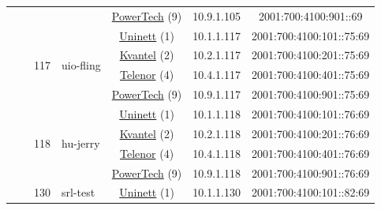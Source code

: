 \begin{small}
\begin{center}
\begin{longtable}{|c|c|c|c|c|c|c|c|}
  &  & \multicolumn{2}{|c|}{} & \multicolumn{2}{|c|}{\tiny{\href{http://www.powertech.no}{PowerTech} (9)}} & \tiny{10.9.1.105} & \tiny{2001:700:4100:901::69} \\* \cline{3-3}\cline{4-4}\cline{5-5}\cline{6-6}\cline{7-7}\cline{8-8}
  &  & \multirow{4}{*}{\tiny{117}} & \multicolumn{1}{|l|}{\multirow{4}{*}{\tiny{uio-fling}}} & \multicolumn{2}{|c|}{\tiny{\href{https://www.uninett.no}{Uninett} (1)}} & \tiny{10.1.1.117} & \tiny{2001:700:4100:101::75:69} \\* \cline{5-5}\cline{6-6}\cline{7-7}\cline{8-8}
  &  &  &  & \multicolumn{2}{|c|}{\tiny{\href{http://kvantel.no}{Kvantel} (2)}} & \tiny{10.2.1.117} & \tiny{2001:700:4100:201::75:69} \\* \cline{5-5}\cline{6-6}\cline{7-7}\cline{8-8}
  &  &  &  & \multicolumn{2}{|c|}{\tiny{\href{https://www.telenor.no}{Telenor} (4)}} & \tiny{10.4.1.117} & \tiny{2001:700:4100:401::75:69} \\* \cline{5-5}\cline{6-6}\cline{7-7}\cline{8-8}
  &  &  &  & \multicolumn{2}{|c|}{\tiny{\href{http://www.powertech.no}{PowerTech} (9)}} & \tiny{10.9.1.117} & \tiny{2001:700:4100:901::75:69} \\* \cline{3-3}\cline{4-4}\cline{5-5}\cline{6-6}\cline{7-7}\cline{8-8}
  &  & \multirow{4}{*}{\tiny{118}} & \multicolumn{1}{|l|}{\multirow{4}{*}{\tiny{hu-jerry}}} & \multicolumn{2}{|c|}{\tiny{\href{https://www.uninett.no}{Uninett} (1)}} & \tiny{10.1.1.118} & \tiny{2001:700:4100:101::76:69} \\* \cline{5-5}\cline{6-6}\cline{7-7}\cline{8-8}
  &  &  &  & \multicolumn{2}{|c|}{\tiny{\href{http://kvantel.no}{Kvantel} (2)}} & \tiny{10.2.1.118} & \tiny{2001:700:4100:201::76:69} \\* \cline{5-5}\cline{6-6}\cline{7-7}\cline{8-8}
  &  &  &  & \multicolumn{2}{|c|}{\tiny{\href{https://www.telenor.no}{Telenor} (4)}} & \tiny{10.4.1.118} & \tiny{2001:700:4100:401::76:69} \\* \cline{5-5}\cline{6-6}\cline{7-7}\cline{8-8}
  &  &  &  & \multicolumn{2}{|c|}{\tiny{\href{http://www.powertech.no}{PowerTech} (9)}} & \tiny{10.9.1.118} & \tiny{2001:700:4100:901::76:69} \\* \cline{3-3}\cline{4-4}\cline{5-5}\cline{6-6}\cline{7-7}\cline{8-8}
  &  & \multirow{4}{*}{\tiny{130}} & \multicolumn{1}{|l|}{\multirow{4}{*}{\tiny{srl-test}}} & \multicolumn{2}{|c|}{\tiny{\href{https://www.uninett.no}{Uninett} (1)}} & \tiny{10.1.1.130} & \tiny{2001:700:4100:101::82:69} \\* \cline{5-5}\cline{6-6}\cline{7-7}\cline{8-8}

\end{longtable}
\end{center}
\end{small}
